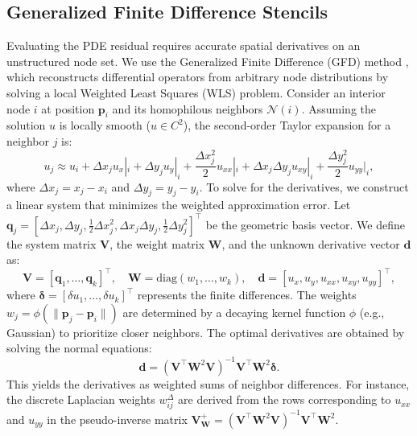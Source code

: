 \documentclass[11pt]{article}
\theoremstyle{definition}
\theoremstyle{remark}
\theoremstyle{plain}
\begin{document}
\subsection{Generalized Finite Difference Stencils}
\label{sec:gfd}

Evaluating the PDE residual requires accurate spatial derivatives on an unstructured node set. We use the Generalized Finite Difference (GFD) method \cite{liszka1980finite, benito2001influence}, which reconstructs differential operators from arbitrary node distributions by solving a local Weighted Least Squares (WLS) problem. Consider an interior node $i$ at position $\mathbf{p}_i$ and its homophilous neighbors $\mathcal{N}(i)$. Assuming the solution $u$ is locally smooth ($u \in C^2$), the second-order Taylor expansion for a neighbor $j$ is:
\begin{equation}
    u_j \approx u_i + \Delta x_j u_x|_i + \Delta y_j u_y|_i + \frac{\Delta x_j^2}{2} u_{xx}|_i + \Delta x_j \Delta y_j u_{xy}|_i + \frac{\Delta y_j^2}{2} u_{yy}|_i,
\end{equation}
where $\Delta x_j = x_j - x_i$ and $\Delta y_j = y_j - y_i$. To solve for the derivatives, we construct a linear system that minimizes the weighted approximation error. Let $\mathbf{q}_j = [\Delta x_j, \Delta y_j, \frac{1}{2}\Delta x_j^2, \Delta x_j \Delta y_j, \frac{1}{2}\Delta y_j^2]^\top$ be the geometric basis vector. We define the system matrix $\mathbf{V}$, the weight matrix $\mathbf{W}$, and the unknown derivative vector $\mathbf{d}$ as:
\begin{equation}
    \mathbf{V} = [\mathbf{q}_1, \dots, \mathbf{q}_k]^\top, \quad
    \mathbf{W} = \text{diag}(w_1, \dots, w_k), \quad
    \mathbf{d} = [u_x, u_y, u_{xx}, u_{xy}, u_{yy}]^\top,
\end{equation} 
where $\boldsymbol{\delta} = [\delta u_1, \dots, \delta u_k]^\top$ represents the finite differences. The weights $w_j = \phi(\|\mathbf{p}_j - \mathbf{p}_i\|)$ are determined by a decaying kernel function $\phi$ (e.g., Gaussian) to prioritize closer neighbors. The optimal derivatives are obtained by solving the normal equations:
\begin{equation}
    \mathbf{d} = (\mathbf{V}^\top \mathbf{W}^2 \mathbf{V})^{-1} \mathbf{V}^\top \mathbf{W}^2 \boldsymbol{\delta}.
\end{equation}
This yields the derivatives as weighted sums of neighbor differences. For instance, the discrete Laplacian weights $w_{ij}^{\Delta}$ are derived from the rows corresponding to $u_{xx}$ and $u_{yy}$ in the pseudo-inverse matrix $\mathbf{V}^+_{\mathbf{W}} = (\mathbf{V}^\top \mathbf{W}^2 \mathbf{V})^{-1} \mathbf{V}^\top \mathbf{W}^2$.
\end{document}
